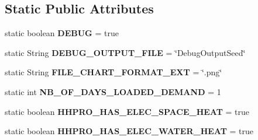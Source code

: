 \subsection*{Static Public Attributes}
\begin{DoxyCompactItemize}
\item 
\hypertarget{classuk_1_1ac_1_1dmu_1_1iesd_1_1cascade_1_1base_1_1_consts_a97744887646d281b50b7ef920e026795}{static boolean {\bfseries D\-E\-B\-U\-G} = true}\label{classuk_1_1ac_1_1dmu_1_1iesd_1_1cascade_1_1base_1_1_consts_a97744887646d281b50b7ef920e026795}

\item 
\hypertarget{classuk_1_1ac_1_1dmu_1_1iesd_1_1cascade_1_1base_1_1_consts_a5dbd309445d94a13ba543e1d9a4e2b89}{static String {\bfseries D\-E\-B\-U\-G\-\_\-\-O\-U\-T\-P\-U\-T\-\_\-\-F\-I\-L\-E} = \char`\"{}Debug\-Output\-Seed\char`\"{}}\label{classuk_1_1ac_1_1dmu_1_1iesd_1_1cascade_1_1base_1_1_consts_a5dbd309445d94a13ba543e1d9a4e2b89}

\item 
\hypertarget{classuk_1_1ac_1_1dmu_1_1iesd_1_1cascade_1_1base_1_1_consts_a7a7c66a829e5009603e84f9ceeb0ee7d}{static String {\bfseries F\-I\-L\-E\-\_\-\-C\-H\-A\-R\-T\-\_\-\-F\-O\-R\-M\-A\-T\-\_\-\-E\-X\-T} = \char`\"{}.png\char`\"{}}\label{classuk_1_1ac_1_1dmu_1_1iesd_1_1cascade_1_1base_1_1_consts_a7a7c66a829e5009603e84f9ceeb0ee7d}

\item 
\hypertarget{classuk_1_1ac_1_1dmu_1_1iesd_1_1cascade_1_1base_1_1_consts_a3156f07f22677d8ceae15fb3f0e31922}{static int {\bfseries N\-B\-\_\-\-O\-F\-\_\-\-D\-A\-Y\-S\-\_\-\-L\-O\-A\-D\-E\-D\-\_\-\-D\-E\-M\-A\-N\-D} = 1}\label{classuk_1_1ac_1_1dmu_1_1iesd_1_1cascade_1_1base_1_1_consts_a3156f07f22677d8ceae15fb3f0e31922}

\item 
\hypertarget{classuk_1_1ac_1_1dmu_1_1iesd_1_1cascade_1_1base_1_1_consts_a6d17ef1065ffdde79617c22ef239fa4d}{static boolean {\bfseries H\-H\-P\-R\-O\-\_\-\-H\-A\-S\-\_\-\-E\-L\-E\-C\-\_\-\-S\-P\-A\-C\-E\-\_\-\-H\-E\-A\-T} = true}\label{classuk_1_1ac_1_1dmu_1_1iesd_1_1cascade_1_1base_1_1_consts_a6d17ef1065ffdde79617c22ef239fa4d}

\item 
\hypertarget{classuk_1_1ac_1_1dmu_1_1iesd_1_1cascade_1_1base_1_1_consts_ae560bc82ef42f8288868c3ded2ff18f5}{static boolean {\bfseries H\-H\-P\-R\-O\-\_\-\-H\-A\-S\-\_\-\-E\-L\-E\-C\-\_\-\-W\-A\-T\-E\-R\-\_\-\-H\-E\-A\-T} = true}\label{classuk_1_1ac_1_1dmu_1_1iesd_1_1cascade_1_1base_1_1_consts_ae560bc82ef42f8288868c3ded2ff18f5}


\end{DoxyCompactItemize}
